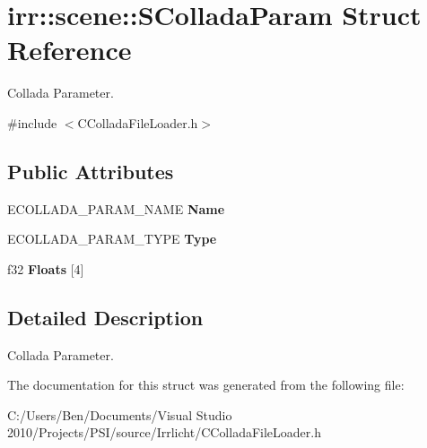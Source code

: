 \hypertarget{structirr_1_1scene_1_1_s_collada_param}{\section{irr\-:\-:scene\-:\-:S\-Collada\-Param Struct Reference}
\label{structirr_1_1scene_1_1_s_collada_param}
}


Collada Parameter.  




{\ttfamily \#include $<$C\-Collada\-File\-Loader.\-h$>$}

\subsection*{Public Attributes}
\begin{DoxyCompactItemize}
\item 
\hypertarget{structirr_1_1scene_1_1_s_collada_param_a635dd43652f5957c8d1aa68472d99678}{E\-C\-O\-L\-L\-A\-D\-A\-\_\-\-P\-A\-R\-A\-M\-\_\-\-N\-A\-M\-E {\bfseries Name}}\label{structirr_1_1scene_1_1_s_collada_param_a635dd43652f5957c8d1aa68472d99678}

\item 
\hypertarget{structirr_1_1scene_1_1_s_collada_param_af44652aafa990290d8b2e99f7351283d}{E\-C\-O\-L\-L\-A\-D\-A\-\_\-\-P\-A\-R\-A\-M\-\_\-\-T\-Y\-P\-E {\bfseries Type}}\label{structirr_1_1scene_1_1_s_collada_param_af44652aafa990290d8b2e99f7351283d}

\item 
\hypertarget{structirr_1_1scene_1_1_s_collada_param_ace3a67feec86dab39398e444abfd8356}{f32 {\bfseries Floats} \mbox{[}4\mbox{]}}\label{structirr_1_1scene_1_1_s_collada_param_ace3a67feec86dab39398e444abfd8356}

\end{DoxyCompactItemize}


\subsection{Detailed Description}
Collada Parameter. 

The documentation for this struct was generated from the following file\-:\begin{DoxyCompactItemize}
\item 
C\-:/\-Users/\-Ben/\-Documents/\-Visual Studio 2010/\-Projects/\-P\-S\-I/source/\-Irrlicht/C\-Collada\-File\-Loader.\-h\end{DoxyCompactItemize}
